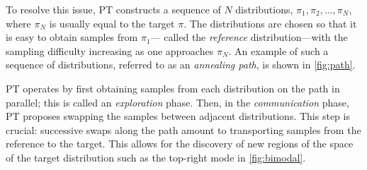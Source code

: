 To resolve this issue, PT constructs a sequence of $N$ distributions,  
$\pi_1, \pi_2, \ldots, \pi_N$, where $\pi_N$ is usually equal to the target $\pi$.
The distributions are chosen so that it is easy to obtain samples from $\pi_1$---%
called the \emph{reference} distribution---with the sampling difficulty increasing 
as one approaches $\pi_N$. An example of such a sequence of distributions, referred 
to as an \emph{annealing path}, is shown in \cref{fig:path}.

PT operates by first obtaining samples from each distribution on the path in parallel;
this is called an \emph{exploration} phase. Then, in the \emph{communication} phase, 
PT proposes swapping the samples between adjacent distributions. This step is crucial:
successive swaps along the path amount to transporting samples from the reference
to the target. This allows for the discovery of new regions of the space of the 
target distribution such as the top-right mode in \cref{fig:bimodal}.
